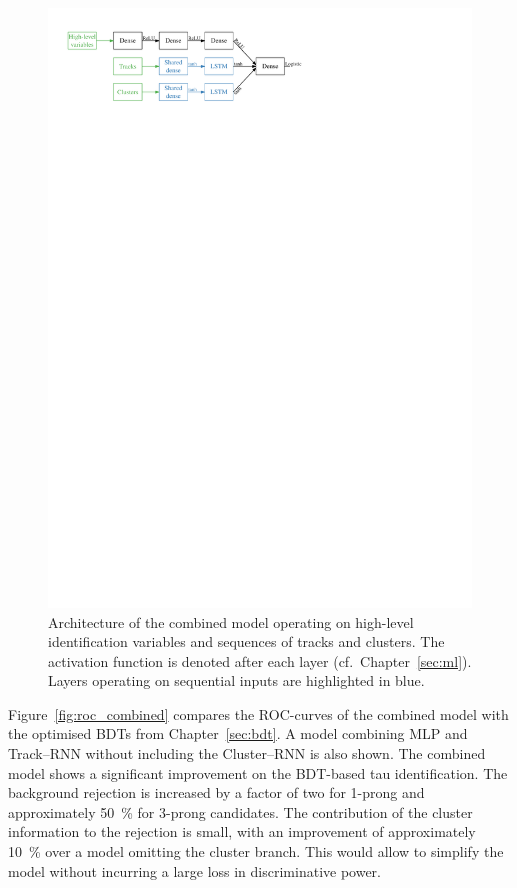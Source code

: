 \begin{figure}[htb]
  \centering
  \includegraphics{./figures/rnn/combined_architecture.pdf}
  \caption{Architecture of the combined model operating on high-level
    identification variables and sequences of tracks and clusters. The
    activation function is denoted after each layer (cf.\ Chapter~\ref{sec:ml}).
    Layers operating on sequential inputs are highlighted in blue.}
  \label{fig:schematic_combined}
\end{figure}

Figure~\ref{fig:roc_combined} compares the ROC-curves of the combined model with
the optimised BDTs from Chapter~\ref{sec:bdt}. A model combining MLP and
Track--RNN without including the Cluster--RNN is also shown. The combined model
shows a significant improvement on the BDT-based tau identification. The
background rejection is increased by a factor of two for 1-prong and
approximately \SI{50}{\percent} for 3-prong candidates. The contribution of the
cluster information to the rejection is small, with an improvement of
approximately \SI{10}{\percent} over a model omitting the cluster branch. This
would allow to simplify the model without incurring a large loss in
discriminative power. 

